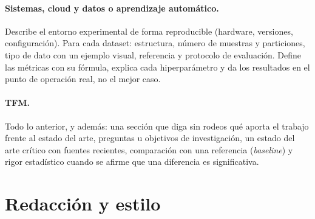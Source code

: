 \documentclass[11pt,a4paper]{article}
\begin{document}
\paragraph{Sistemas, cloud y datos o aprendizaje automático.} Describe el
entorno experimental de forma reproducible (hardware, versiones, configuración).
Para cada dataset: estructura, número de muestras y particiones, tipo de dato
con un ejemplo visual, referencia y protocolo de evaluación. Define las métricas
con su fórmula, explica cada hiperparámetro y da los resultados en el punto de
operación real, no el mejor caso.

\paragraph{TFM.} Todo lo anterior, y además: una sección que diga sin rodeos qué
aporta el trabajo frente al estado del arte, preguntas u objetivos de
investigación, un estado del arte crítico con fuentes recientes, comparación con
una referencia (\emph{baseline}) y rigor estadístico cuando se afirme que una
diferencia es significativa.

\section{Redacción y estilo}
\label{sec:redaccion}
\end{document}
